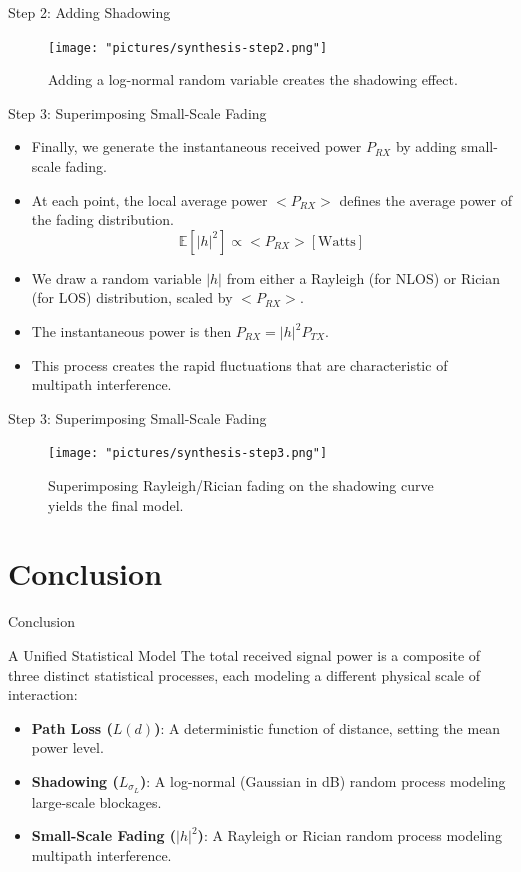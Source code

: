 \documentclass{beamer}
\begin{document}
	\begin{frame}{Step 2: Adding Shadowing}
		\begin{figure}
			\centering
			\texttt{[image: "pictures/synthesis-step2.png"]}
			\caption{Adding a log-normal random variable creates the shadowing effect.}
		\end{figure}
	\end{frame}
	
	\begin{frame}{Step 3: Superimposing Small-Scale Fading}
		\begin{itemize}
			\item Finally, we generate the instantaneous received power $P_{RX}$ by adding small-scale fading.
			\item At each point, the local average power $<P_{RX}>$ defines the average power of the fading distribution.
			\[ \mathbb{E}[|h|^2] \propto <P_{RX}>[\text{Watts}] \]
			\item We draw a random variable $|h|$ from either a Rayleigh (for NLOS) or Rician (for LOS) distribution, scaled by $<P_{RX}>$.
			\item The instantaneous power is then $P_{RX} = |h|^2 P_{TX}$.
			\item This process creates the rapid fluctuations that are characteristic of multipath interference.
		\end{itemize}
	\end{frame}
	
	\begin{frame}{Step 3: Superimposing Small-Scale Fading}
		\begin{figure}
			\centering
			\texttt{[image: "pictures/synthesis-step3.png"]}
			\caption{Superimposing Rayleigh/Rician fading on the shadowing curve yields the final model.}
		\end{figure}
	\end{frame}
	
	\section{Conclusion}
	
	\begin{frame}{Conclusion}
		\begin{alertblock}{A Unified Statistical Model}
			The total received signal power is a composite of three distinct statistical processes, each modeling a different physical scale of interaction:
			\begin{itemize}
				\item \textbf{Path Loss ($L(d)$)}: A deterministic function of distance, setting the mean power level.
				\item \textbf{Shadowing ($L_{\sigma_L}$)}: A log-normal (Gaussian in dB) random process modeling large-scale blockages.
				\item \textbf{Small-Scale Fading ($|h|^2$)}: A Rayleigh or Rician random process modeling multipath interference.
			\end{itemize}
		\end{alertblock}
	\end{frame}
	
\end{document}
